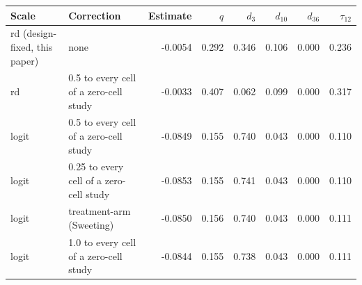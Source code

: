 \begin{tabular}{llrrrrrr}
\toprule
Scale & Correction & Estimate & $q$ & $d_3$ & $d_{10}$ & $d_{36}$ & $\tau_{12}$ \\
\midrule
rd (design-fixed, this paper) & none & -0.0054 & 0.292 & 0.346 & 0.106 & 0.000 & 0.236 \\
rd & 0.5 to every cell of a zero-cell study & -0.0033 & 0.407 & 0.062 & 0.099 & 0.000 & 0.317 \\
logit & 0.5 to every cell of a zero-cell study & -0.0849 & 0.155 & 0.740 & 0.043 & 0.000 & 0.110 \\
logit & 0.25 to every cell of a zero-cell study & -0.0853 & 0.155 & 0.741 & 0.043 & 0.000 & 0.110 \\
logit & treatment-arm (Sweeting) & -0.0850 & 0.156 & 0.740 & 0.043 & 0.000 & 0.111 \\
logit & 1.0 to every cell of a zero-cell study & -0.0844 & 0.155 & 0.738 & 0.043 & 0.000 & 0.111 \\
\bottomrule
\end{tabular}
